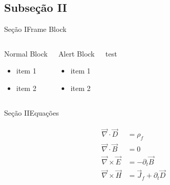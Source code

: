 \documentclass[aspectratio=169]{beamer}
\begin{document}
\subsection{Subseção II}
\begin{slide}{Seção I}{Frame Block}
	\begin{columns}
		\begin{block}{Normal Block}
			\begin{itemize}[<+(1)->]
				\item item 1
				\item item 2
			\end{itemize}
		\end{block}
		\begin{alertblock}{Alert Block}
			\begin{itemize}[<+(1)->]
				\item  item 1
				\item  item 2
			\end{itemize}
		\end{alertblock}

		\begin{block}{test}
		\end{block}
	\end{columns}
\end{slide}

\begin{slide}{Seção II}{Equações}
	\centering

	\begin{exampleblock}{}
		\begin{align*}
			\begin{split}
				\vec{\nabla}\cdot\vec{D} &= \rho_{f} \\
				\vec{\nabla}\cdot\vec{B} &= 0	\\
				\vec{\nabla}\times \vec{E} &= -\partial_t \vec{B}\\
				\vec{\nabla}\times \vec{H} &= \vec{J}_{f}+\partial_t \vec{D}
			\end{split}
		\end{align*}	
	\end{exampleblock}
\end{slide}
\end{document}
